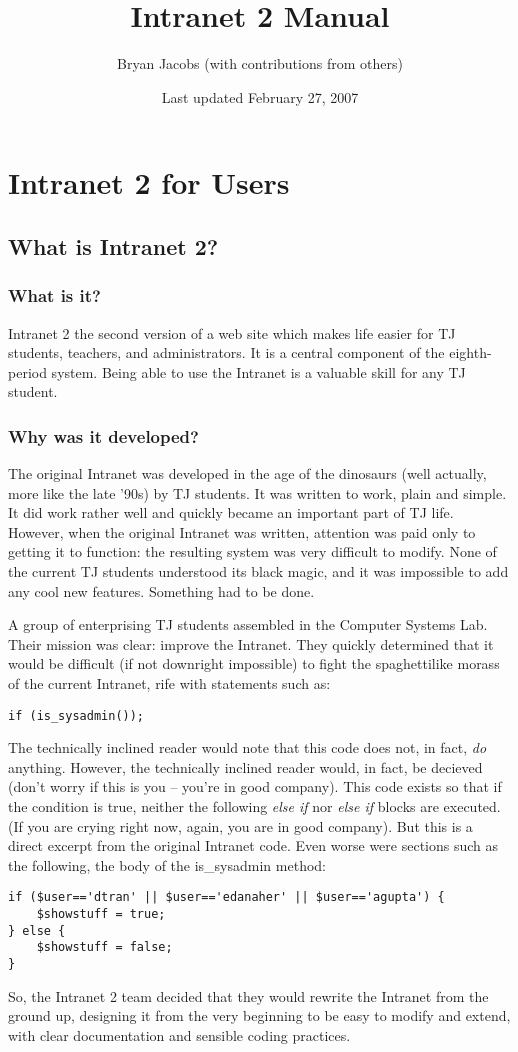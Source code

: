 \documentclass[11pt,letterpaper]{report}
\author{Bryan Jacobs (with contributions from others)}
\title{Intranet 2 Manual}
\date{Last updated February 27, 2007}
\begin{document}
\maketitle
\tableofcontents
\chapter{Intranet 2 for Users}
\section{What is Intranet 2?}
\subsection{What is it?}
Intranet 2 the second version of a web site which makes life easier for TJ students, teachers, and administrators.  
It is a central component of the eighth-period system.  Being able to use the Intranet is a valuable
skill for any TJ student.
\subsection{Why was it developed?}
The original Intranet was developed in the age of the dinosaurs (well actually, more like the late '90s) by TJ students.
It was written to work, plain and simple.  It did work rather well and quickly became an important part of TJ life.
However, when the original Intranet was written, attention was paid only to getting it to function: the resulting system
was very difficult to modify.  None of the current TJ students understood its black magic, and it was impossible to add
any cool new features.  Something had to be done.

A group of enterprising TJ students assembled in the Computer Systems Lab.  Their mission was clear: improve the Intranet.
They quickly determined that it would be difficult (if not downright impossible) to fight the spaghettilike morass of the
current Intranet, rife with statements such as:
\begin{lstlisting}
if (is_sysadmin());
\end{lstlisting}
The technically inclined reader would note that this code does not, in fact, \emph{do} anything.
However, the technically inclined reader would, in fact, be decieved (don't worry if this is you -- you're in
good company). This code exists so that if the condition is true,
neither the following \emph{else if} nor \emph{else if} blocks are executed.
(If you are crying right now, again, you are in good company).
But this is a direct excerpt from the original Intranet code.
Even worse were sections such as the following, the body of the is\_sysadmin method:
\begin{lstlisting}
if ($user=='dtran' || $user=='edanaher' || $user=='agupta') {
	$showstuff = true;
} else {
	$showstuff = false;
}
\end{lstlisting}
So, the Intranet 2 team decided that they would rewrite the Intranet from the ground up, designing it from the very beginning
to be easy to modify and extend, with clear documentation and sensible coding practices.
\end{document}
